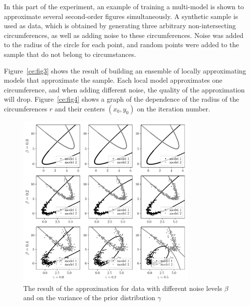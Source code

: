 In this part of the experiment, an example of training a multi-model is shown to approximate several second-order figures simultaneously. A synthetic sample is used as data, which is obtained by generating three arbitrary non-intersecting circumferences, as well as adding noise to these circumferences. Noise was added to the radius of the circle for each point, and random points were added to the sample that do not belong to circumstances.

Figure~\ref{ce:fig3} shows the result of building an ensemble of locally approximating models that approximate the sample. Each local model approximates one circumference, and when adding different noise, the quality of the approximation will drop.
Figure~\ref{ce:fig4} shows a graph of the dependence of the radius of the circumferences $r$ and their centers $(x_0, y_0)$ on the iteration number. 

\begin{figure}[h!t]
\includegraphics[width=0.8\textwidth]{results/priorexpertfig/beta_gamma}
\caption{ The result of the approximation for data with different noise levels $\beta$ and on the variance of the prior distribution $\gamma$}
\label{ce:fig6}
\end{figure}

